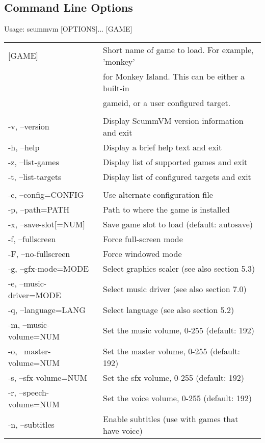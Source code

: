 \subsection{Command Line Options}

Usage: scummvm [OPTIONS]... [GAME]\\
\begin{tabular}{ll}
  [GAME]                  &Short name of game to load. For example, 'monkey'\\
                          &for Monkey Island. This can be either a built-in\\
                          &gameid, or a user configured target.\\
\\
  -v, --version           &Display ScummVM version information and exit\\
  -h, --help              &Display a brief help text and exit\\
  -z, --list-games        &Display list of supported games and exit\\
  -t, --list-targets      &Display list of configured targets and exit\\
\\
  -c, --config=CONFIG     &Use alternate configuration file\\
  -p, --path=PATH         &Path to where the game is installed\\
  -x, --save-slot[=NUM]   &Save game slot to load (default: autosave)\\
  -f, --fullscreen        &Force full-screen mode\\
  -F, --no-fullscreen     &Force windowed mode\\
  -g, --gfx-mode=MODE     &Select graphics scaler (see also section 5.3)\\
  -e, --music-driver=MODE &Select music driver (see also section 7.0)\\
  -q, --language=LANG     &Select language (see also section 5.2)\\
  -m, --music-volume=NUM  &Set the music volume, 0-255 (default: 192)\\
  -o, --master-volume=NUM &Set the master volume, 0-255 (default: 192)\\
  -s, --sfx-volume=NUM    &Set the sfx volume, 0-255 (default: 192)\\
  -r, --speech-volume=NUM  &Set the voice volume, 0-255 (default: 192)\\
  -n, --subtitles         &Enable subtitles (use with games that have voice)\\

\end{tabular}
